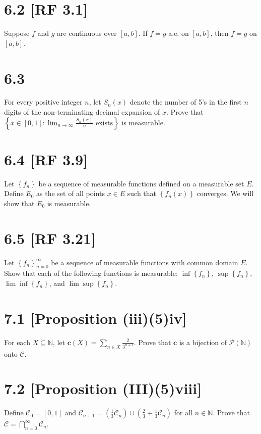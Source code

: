 \documentclass[12pt]{article}
\begin{document}
\section*{6.2 [RF 3.1]}
Suppose $f$ and $g$ are continuous over $[a,b]$. If $f = g$ a.e. on $[a,b]$, then $f = g$ on $[a,b]$.


\section*{6.3}
For every positive integer $n$, let $S_{n}(x)$ denote the number of 5's in the first $n$ digits of the non-terminating decimal expansion of $x$.
Prove that $\left\{ x \in [0,1] : \lim_{n\rightarrow\infty}\frac{S_{n}(x)}{n}\text{ exists} \right\}$ is measurable.



\section*{6.4 [RF 3.9]}
Let $\left\{ f_{n} \right\}$ be a sequence of measurable functions defined on a measurable set $E$. Define $E_{0}$ as the set of all points $x \in E$
such that $\left\{ f_{n}(x) \right\}$ converges. We will show that $E_{0}$ is measurable.



\section*{6.5 [RF 3.21]}
Let $\left\{ f_{n} \right\}_{n=0}^{\infty}$ be a sequence of measurable functions with common domain $E$. Show that each of the following functions is
measurable: $\inf\left\{ f_{n} \right\}$, $\sup\left\{ f_{n} \right\}$, $\lim\inf\left\{ f_{n} \right\}$, and $\lim\sup\left\{ f_{n} \right\}$.



\section*{7.1 [Proposition (iii)(5)iv]}
For each $X\subseteq \mathbb{N}$, let $\bm{c}(X) = \sum_{n\in X}\frac{2}{3^{n+1}}$. Prove that $\bm{c}$ is a bijection of $\mathcal{P}(\mathbb{N})$ onto $\mathcal{C}$.



\section*{7.2 [Proposition (III)(5)viii]}
Define $\mathcal{C}_{0} = [0,1]$ and $\mathcal{C}_{n+1} = \left( \frac{1}{3}\mathcal{C}_{n} \right) \cup \left( \frac{2}{3} +
\frac{1}{3}\mathcal{C}_{n} \right)$ for all $n \in \mathbb{N}$. Prove that $\mathcal{C} = \bigcap_{n=0}^{\infty} \mathcal{C}_{n}$.
\end{document}
